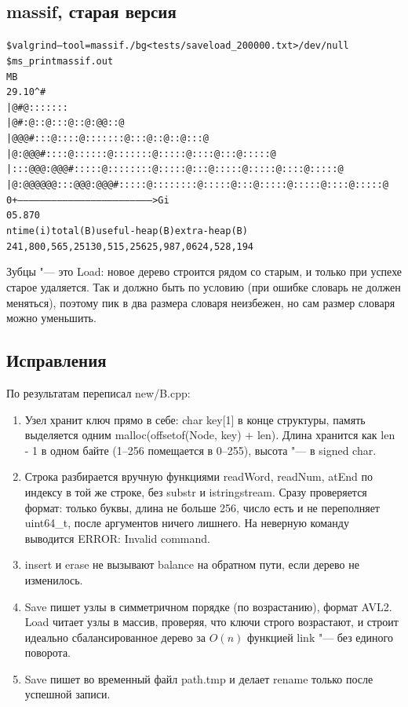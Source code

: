 \subsection{massif, старая версия}
\begin{alltt}
\$ valgrind --tool=massif ./bg < tests/saveload_200000.txt > /dev/null
\$ ms_print massif.out
    MB
29.10^                    #
     |                   @#     @          :     :     :    :     :     :    :
     |                   @#    :@   ::    @:    ::    @:   :@    :@    @:   :@
     |                 @@@#  :::@  :: :  :@:  ::::  ::@:  ::@   ::@  ::@:  ::@
     |              @:@@ @# ::::@ ::: : ::@:  : :: :::@:::::@ ::::@ :::@:::::@
     |         :::@@@:@@ @#:::::@:::: ::::@:: : ::@:::@:::::@:::::@::::@:::::@
     | @:@@@@@@:::@@@:@@ @#:::::@:::: ::::@:: : ::@:::@:::::@:::::@::::@:::::@
   0 +----------------------------------------------------------------------->Gi
     0                                                                   5.870
  n        time(i)         total(B)   useful-heap(B) extra-heap(B)
 24  1,800,565,251       30,515,256       25,987,062     4,528,194
\end{alltt}
Зубцы "--- это {\ttfamily Load}: новое дерево строится рядом со старым, и только при успехе старое
удаляется. Так и должно быть по условию (при ошибке словарь не должен меняться), поэтому пик в два
размера словаря неизбежен, но сам размер словаря можно уменьшить.

\subsection{Исправления}
По результатам переписал {\ttfamily new/B.cpp}:
\begin{enumerate}
\item Узел хранит ключ прямо в себе: {\ttfamily char key[1]} в конце структуры, память выделяется
одним {\ttfamily malloc(offsetof(Node, key) + len)}. Длина хранится как {\ttfamily len - 1} в одном
байте (1--256 помещается в 0--255), высота "--- в {\ttfamily signed char}.
\item Строка разбирается вручную функциями {\ttfamily readWord}, {\ttfamily readNum},
{\ttfamily atEnd} по индексу в той же строке, без {\ttfamily substr} и {\ttfamily istringstream}.
Сразу проверяется формат: только буквы, длина не больше 256, число есть и не переполняет
{\ttfamily uint64\_t}, после аргументов ничего лишнего. На неверную команду выводится
{\ttfamily ERROR: Invalid command}.
\item {\ttfamily insert} и {\ttfamily erase} не вызывают {\ttfamily balance} на обратном пути,
если дерево не изменилось.
\item {\ttfamily Save} пишет узлы в симметричном порядке (по возрастанию), формат {\ttfamily AVL2}.
{\ttfamily Load} читает узлы в массив, проверяя, что ключи строго возрастают, и строит идеально
сбалансированное дерево за $O(n)$ функцией {\ttfamily link} "--- без единого поворота.
\item {\ttfamily Save} пишет во временный файл {\ttfamily path.tmp} и делает {\ttfamily rename}
только после успешной записи.
\end{enumerate}

